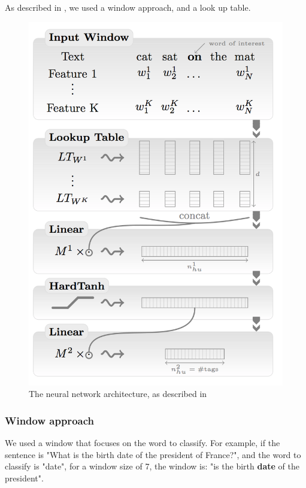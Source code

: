 As described in \cite{collobert}, we used a window approach, and a look up table.

\begin{figure}[!ht]
  \centering
  \caption{The neural network architecture, as described in \cite{collobert}}
  \label{sandalone:tree_four}
    \includegraphics[scale=0.5]{../NLP-standalone-images/network.png}
\end{figure}

\subsubsection{Window approach}

We used a window that focuses on the word to classify. For example, if the sentence is "What is the birth date of the president of France?", and the word to classify is "date", for a window size of 7, the window is: "is the birth \textbf{date} of the president".

